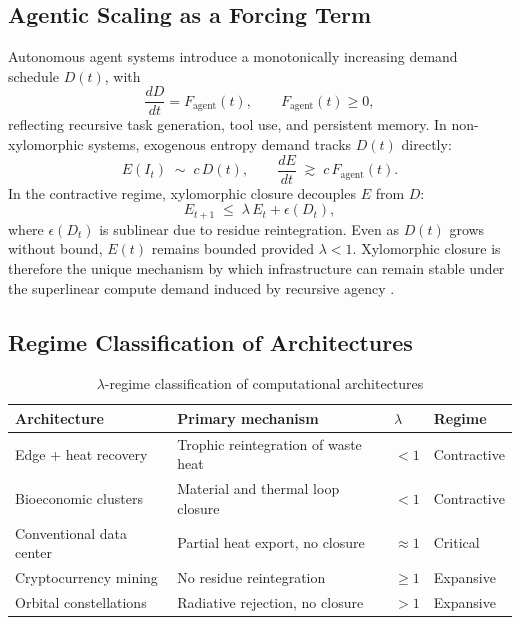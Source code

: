 \documentclass[11pt,a4paper]{article}
\theoremstyle{plain}
\theoremstyle{definition}
\theoremstyle{remark}
\begin{document}
\subsection{Agentic Scaling as a Forcing Term}

Autonomous agent systems introduce a monotonically increasing demand schedule
$D(t)$, with
\[
  \frac{dD}{dt} = F_{\mathrm{agent}}(t), \qquad F_{\mathrm{agent}}(t) \geq 0,
\]
reflecting recursive task generation, tool use, and persistent memory. In
non-xylomorphic systems, exogenous entropy demand tracks $D(t)$ directly:
\[
  E(I_{t}) \;\sim\; c\,D(t),
  \qquad \frac{dE}{dt} \;\gtrsim\; c\,F_{\mathrm{agent}}(t).
\]
In the contractive regime, xylomorphic closure decouples $E$ from $D$:
\[
  E_{t+1} \;\leq\; \lambda\,E_{t} + \epsilon(D_{t}),
\]
where $\epsilon(D_{t})$ is sublinear due to residue reintegration. Even as
$D(t)$ grows without bound, $E(t)$ remains bounded provided $\lambda < 1$.
Xylomorphic closure is therefore the unique mechanism by which infrastructure
can remain stable under the superlinear compute demand induced by recursive
agency \citep{odum1994,daly2011}.

\subsection{Regime Classification of Architectures}

\begin{table}[h]
\centering
\caption{$\lambda$-regime classification of computational architectures}
\label{tab:regimes}
\begin{tabular}{p{4.2cm}p{4.8cm}p{1.4cm}p{2cm}}
\toprule
Architecture & Primary mechanism & $\lambda$ & Regime \\
\midrule
Edge + heat recovery     & Trophic reintegration of waste heat  & $<1$        & Contractive \\
Bioeconomic clusters     & Material and thermal loop closure    & $<1$        & Contractive \\
Conventional data center & Partial heat export, no closure      & $\approx 1$ & Critical    \\
Cryptocurrency mining    & No residue reintegration             & $\geq 1$    & Expansive   \\
Orbital constellations   & Radiative rejection, no closure      & $>1$        & Expansive   \\
\bottomrule
\end{tabular}
\end{table}
\end{document}
